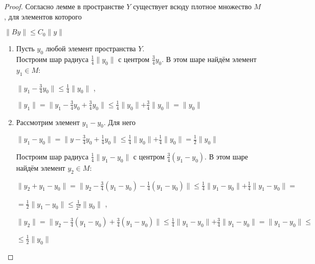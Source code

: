 \documentclass[12pt,a4paper,titlepage, oneside]{book}
\theoremstyle{definition}
\theoremstyle{plain}
\theoremstyle{remark}
\theoremstyle{remark}
\theoremstyle{remark}
\theoremstyle{plain}
\theoremstyle{plain}
\begin{document}
\begin{proof}
Согласно лемме в пространстве $Y$ существует всюду плотное множество $M$, для элементов которого
\begin{center}
	$\parallel By \parallel \leq C_0 \parallel y \parallel $
\end{center}
\begin{enumerate}

	\item Пусть $y_0$ любой элемент пространства $Y$.\\
	Построим шар радиуса $\frac{1}{4}\parallel y_0 \parallel$ с 		центром $\frac{3}{4}y_0$. В этом шаре найдём элемент
	$y_1 \in M$:
	\begin{center}
	$\parallel y_1 - \frac{3}{4}y_0\parallel \leq \frac{1}{4}    		\parallel y_0 \parallel $  ,
	\end{center}
	\begin{center}
	$\parallel y_1 \parallel =
	\parallel y_1 - \frac{3}{4}y_0 +
	\frac{3}{4}y_0 \parallel \leq \frac{1}{4} 			\parallel y_0 \parallel +
	 \frac{3}{4}\parallel y_0\parallel = 				\parallel y_0 \parallel$
	\end{center}
	
	\item Рассмотрим элемент $y_1 - y_0$. Для него
	\begin{center}
	$\parallel y_1-y_0 \parallel =\parallel y - \frac{3}{4}y_0 +
	\frac{1}{4}y_0 \parallel \leq
	\frac{1}{4} \parallel y_0 \parallel +
	\frac{1}{4} \parallel y_0 \parallel =
	\frac{1}{2} \parallel y_0 \parallel$
	\end{center}
	Построим шар радиуса $\frac{1}{4} \parallel 		y_1 - y_0 \parallel$ с центром $\frac{3}{4}			(y_1 - y_0)$. В этом шаре найдём элемент 			$y_2 \in M$:
	\begin{center}
	$\parallel y_2 + y_1 - y_0 \parallel =
	\parallel y_2 - \frac{3}{4}(y_1 - y_0) -
	\frac{1}{4}(y_1 - y_0) \parallel \leq
	\frac{1}{4} \parallel y_1 - y_0 \parallel +
	\frac{1}{4} \parallel y_1 - y_0 \parallel = $
	\end{center}
	\begin{center}
	$ = \frac{1}{2} \parallel y_1 - y_0 \parallel 			\leq
	\frac{1}{2^2} \parallel y_0 \parallel$ ,
	\end{center}
	\begin{center}
	$\parallel y_2 \parallel =
	\parallel y_2 - \frac{3}{4}(y_1 - y_0) +
	\frac{3}{4}(y_1 - y_0) \parallel \leq
	\frac{1}{4} \parallel y_1 - y_0 \parallel +
	\frac{3}{4} \parallel y_1 - y_0 \parallel =
	 \parallel y_1 - y_0 \parallel \leq$
	 \end{center}
	\begin{center}
	 $ \leq \frac{1}{2} \parallel y_0 \parallel$
	\end{center}
	

\end{enumerate}
\end{proof}
\end{document}
